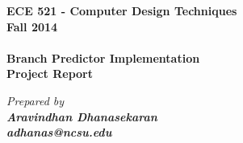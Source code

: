 \documentclass[a4paper]{article}
\date{}                             %
\begin{document}
    \begin{titlepage}
        \vspace*{\fill}
        \begin{center}
            {\huge \bf ECE 521 - Computer Design Techniques \\ Fall 2014 \\ \vspace {8 mm} \\ \LARGE \bf Branch Predictor Implementation \\ \vspace{4 mm} Project Report}
            
            {\vspace{9 mm} \it \large Prepared by \\ \bf \Large Aravindhan Dhanasekaran\\ \bf \large adhanas@ncsu.edu}
        \end{center}
        \vspace*{\fill}
    \end{titlepage}


\newpage
\tableofcontents
\listoffigures
\listoftables
\newpage
{}







\end{document}
